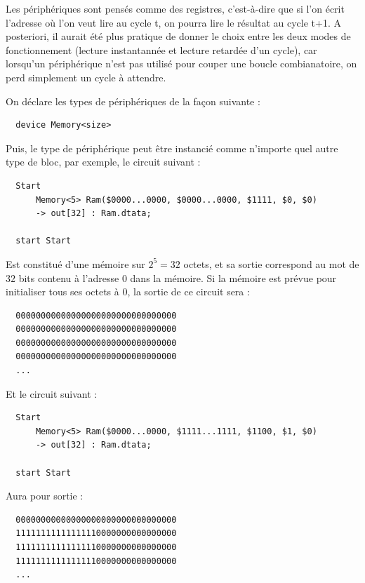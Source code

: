 \documentclass[13pt]{article}
\begin{document}
Les périphériques sont pensés comme des registres, c'est-à-dire que si l'on
écrit l'adresse où l'on veut lire au cycle t, on pourra lire le résultat au
cycle t+1. A posteriori, il aurait été plus pratique de donner le choix
entre les deux modes de fonctionnement (lecture instantannée et lecture
retardée d'un cycle), car lorsqu'un périphérique n'est pas utilisé pour
couper une boucle combianatoire, on perd simplement un cycle à attendre.

On déclare les types de périphériques de la façon suivante :

\begin{verbatim}
  device Memory<size>
\end{verbatim}

Puis, le type de périphérique peut être instancié comme n'importe quel
autre type de bloc, par exemple, le circuit suivant :
\begin{verbatim}
  Start
      Memory<5> Ram($0000...0000, $0000...0000, $1111, $0, $0)
      -> out[32] : Ram.dtata;

  start Start
\end{verbatim}
Est constitué d'une mémoire sur $2^5 = 32$ octets, et sa sortie correspond au
mot de $32$ bits contenu à l'adresse $0$ dans la mémoire. Si la mémoire est
prévue pour initialiser tous ses octets à $0$, la sortie de ce circuit sera :

\begin{verbatim}
  00000000000000000000000000000000
  00000000000000000000000000000000
  00000000000000000000000000000000
  00000000000000000000000000000000
  ...
\end{verbatim}

Et le circuit suivant :

\begin{verbatim}
  Start
      Memory<5> Ram($0000...0000, $1111...1111, $1100, $1, $0)
      -> out[32] : Ram.dtata;

  start Start
\end{verbatim}

Aura pour sortie :

\begin{verbatim}
  00000000000000000000000000000000
  11111111111111110000000000000000
  11111111111111110000000000000000
  11111111111111110000000000000000
  ...
\end{verbatim}
\end{document}
